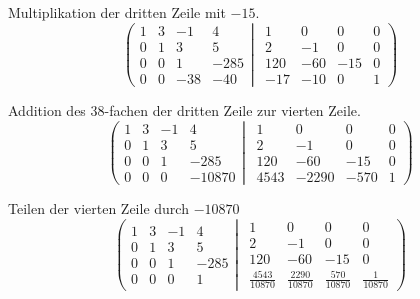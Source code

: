 \documentclass[a4paper,german,12pt,smallheadings]{scrartcl}
\begin{document}
Multiplikation der dritten Zeile mit $-15$.
\begin{equation*}
\left(
 \begin{matrix}
 1 & 3 & -1 & 4 \\
 0 & 1 & 3 & 5 \\
 0 & 0 & 1 & -285 \\
 0 & 0 & -38 & -40
 \end{matrix}
 \left|
  \hspace{5pt}
  \begin{matrix}
  1 & 0 & 0 & 0 \\
  2 & -1 & 0 & 0 \\
  120 & -60 & -15 & 0 \\
  -17 & -10 & 0 & 1
  \end{matrix}
 \right)
\right.
\end{equation*}

Addition des $38$-fachen der dritten Zeile zur vierten Zeile.
\begin{equation*}
\left(
 \begin{matrix}
 1 & 3 & -1 & 4 \\
 0 & 1 & 3 & 5 \\
 0 & 0 & 1 & -285 \\
 0 & 0 & 0 & -10870
 \end{matrix}
 \left|
  \hspace{5pt}
  \begin{matrix}
  1 & 0 & 0 & 0 \\
  2 & -1 & 0 & 0 \\
  120 & -60 & -15 & 0 \\
  4543 & -2290 & -570 & 1
  \end{matrix}
 \right)
\right.
\end{equation*}

Teilen der vierten Zeile durch $-10870$
\begin{equation*}
\left(
 \begin{matrix}
 1 & 3 & -1 & 4 \\
 0 & 1 & 3 & 5 \\
 0 & 0 & 1 & -285 \\
 0 & 0 & 0 & 1
 \end{matrix}
 \left|
  \hspace{5pt}
  \begin{matrix}
  1 & 0 & 0 & 0 \\
  2 & -1 & 0 & 0 \\
  120 & -60 & -15 & 0 \\
  \frac{4543}{10870} & \frac{2290}{10870} & \frac{570}{10870} & \frac{1}{10870}
  \end{matrix}
 \right)
\right.
\end{equation*}
\end{document}
